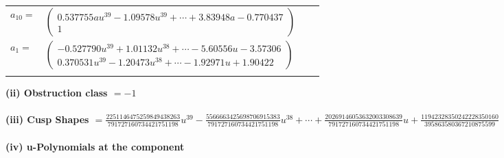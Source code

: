 \documentclass[1p]{elsarticle_modified}
\theoremstyle{definition}
\begin{document}
\begin{tabular}{m{7pt} m{180pt} m{7pt} m{180pt} }
\flushright $a_{10}=$&$\begin{pmatrix}0.537755 a u^{39}-1.09578 u^{39}+\cdots+3.83948 a-0.770437\\1\end{pmatrix}$ \\
\flushright $a_{1}=$&$\begin{pmatrix}-0.527790 u^{39}+1.01132 u^{38}+\cdots-5.60556 u-3.57306\\0.370531 u^{39}-1.20473 u^{38}+\cdots-1.92971 u+1.90422\end{pmatrix}$\\&\end{tabular}
\flushleft \textbf{(ii) Obstruction class $= -1$}\\~\\
\flushleft \textbf{(iii) Cusp Shapes $= \frac{2251146475259849438263}{791727160734421751198} u^{39}-\frac{5566663425698706915383}{791727160734421751198} u^{38}+\cdots+\frac{20269146053632003308639}{791727160734421751198} u+\frac{11942328350242228350160}{395863580367210875599}$}\\~\\
\newpage\renewcommand{\arraystretch}{1}
\flushleft \textbf{(iv) u-Polynomials at the component}\newline \\
\end{document}
